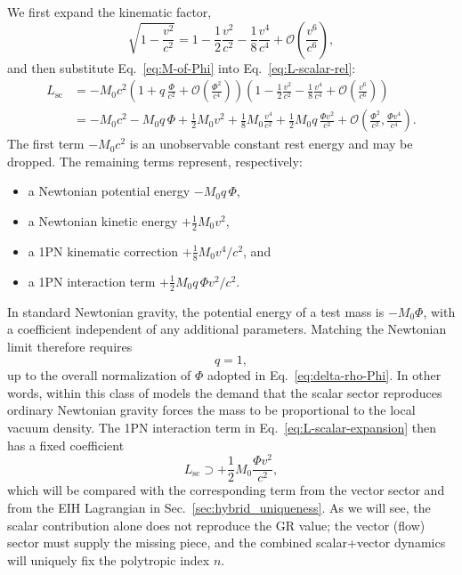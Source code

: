 \documentclass[11pt]{article}
\begin{document}
We first expand the kinematic factor,
\begin{equation}
  \sqrt{1 - \frac{v^2}{c^2}}
  = 1 - \frac{1}{2}\frac{v^2}{c^2}
    - \frac{1}{8}\frac{v^4}{c^4}
    + \mathcal{O}\!\left( \frac{v^6}{c^6} \right),
  \label{eq:sqrt-expansion}
\end{equation}
and then substitute Eq.~\eqref{eq:M-of-Phi} into Eq.~\eqref{eq:L-scalar-rel}:
\begin{align}
  L_{\text{sc}}
  &= -M_0 c^2 \left( 1 + q\,\frac{\Phi}{c^2}
    + \mathcal{O}\!\left( \frac{\Phi^2}{c^4} \right) \right)
     \left( 1 - \frac{1}{2}\frac{v^2}{c^2}
    - \frac{1}{8}\frac{v^4}{c^4}
    + \mathcal{O}\!\left( \frac{v^6}{c^6} \right) \right)
  \nonumber \\
  &= -M_0 c^2
     - M_0 q\,\Phi
     + \frac{1}{2} M_0 v^2
     + \frac{1}{8} M_0 \frac{v^4}{c^2}
     + \frac{1}{2} M_0 q\,\frac{\Phi v^2}{c^2}
     + \mathcal{O}\!\left( \frac{\Phi^2}{c^2}, \frac{\Phi v^4}{c^4} \right).
  \label{eq:L-scalar-expansion}
\end{align}
The first term \(-M_0 c^2\) is an unobservable constant rest energy and may
be dropped.  The remaining terms represent, respectively:
\begin{itemize}
  \item a Newtonian potential energy \(-M_0 q\,\Phi\),
  \item a Newtonian kinetic energy \(+\tfrac{1}{2} M_0 v^2\),
  \item a 1PN kinematic correction \(+\tfrac{1}{8} M_0 v^4/c^2\), and
  \item a 1PN interaction term \(+\tfrac{1}{2} M_0 q\,\Phi v^2/c^2\).
\end{itemize}
In standard Newtonian gravity, the potential energy of a test mass is
\(-M_0 \Phi\), with a coefficient independent of any additional parameters.
Matching the Newtonian limit therefore requires
\begin{equation}
  q = 1,
  \label{eq:q-equals-one}
\end{equation}
up to the overall normalization of \(\Phi\) adopted in
Eq.~\eqref{eq:delta-rho-Phi}.  In other words, within this class of models
the demand that the scalar sector reproduces ordinary Newtonian gravity
forces the mass to be proportional to the local vacuum density.  The 1PN
interaction term in Eq.~\eqref{eq:L-scalar-expansion} then has a fixed
coefficient
\begin{equation}
  L_{\text{sc}} \supset
  +\frac{1}{2} M_0 \frac{\Phi v^2}{c^2},
  \label{eq:L-scalar-1PN-coeff}
\end{equation}
which will be compared with the corresponding term from the vector sector
and from the EIH Lagrangian in Sec.~\ref{sec:hybrid_uniqueness}.  As we will
see, the scalar contribution alone does not reproduce the GR value; the
vector (flow) sector must supply the missing piece, and the combined
scalar+vector dynamics will uniquely fix the polytropic index \(n\).
\end{document}
